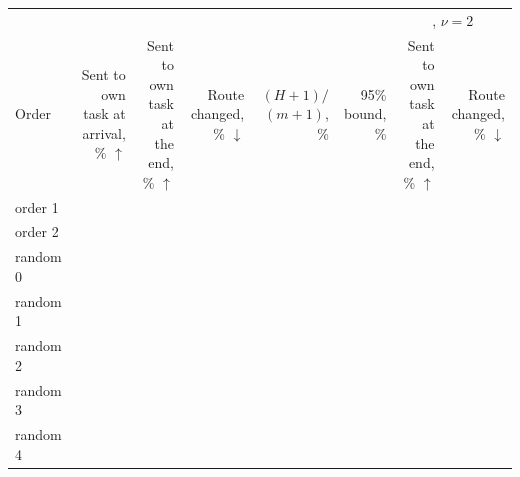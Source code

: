 {\footnotesize\setlength{\tabcolsep}{3pt}\begin{tabular}{lrrrrrrr}
    \toprule
    & \multicolumn{5}{c}{\recog{}} & \multicolumn{2}{c}{\handicap{}, $\nu = 2$} \\
    \cmidrule(lr){2-6}\cmidrule(l){7-8}
    Order & \shortstack[r]{Sent to\\own task\\at arrival,\\\% $\uparrow$} & \shortstack[r]{Sent to\\own task\\at the end,\\\% $\uparrow$} & \shortstack[r]{Route\\changed,\\\% $\downarrow$} & \shortstack[r]{$(H{+}1)/$\\$(m{+}1)$, \%} & \shortstack[r]{95\% bound,\\\%} & \shortstack[r]{Sent to\\own task\\at the end,\\\% $\uparrow$} & \shortstack[r]{Route\\changed,\\\% $\downarrow$} \\
    \midrule
    order 1 & \AudOrdOneLArrive{} & \AudOrdOneLEnd{} & \AudOrdOneLChanged{} & \AudOrdOneLAuditLine{} & \AudOrdOneLAuditBound{} & \AudOrdOneHEnd{} & \AudOrdOneHChanged{} \\
    order 2 & \AudOrdTwoLArrive{} & \AudOrdTwoLEnd{} & \AudOrdTwoLChanged{} & \AudOrdTwoLAuditLine{} & \AudOrdTwoLAuditBound{} & \AudOrdTwoHEnd{} & \AudOrdTwoHChanged{} \\
    random 0 & \AudOrdRandZeroLArrive{} & \AudOrdRandZeroLEnd{} & \AudOrdRandZeroLChanged{} & \AudOrdRandZeroLAuditLine{} & \AudOrdRandZeroLAuditBound{} & \AudOrdRandZeroHEnd{} & \AudOrdRandZeroHChanged{} \\
    random 1 & \AudOrdRandOneLArrive{} & \AudOrdRandOneLEnd{} & \AudOrdRandOneLChanged{} & \AudOrdRandOneLAuditLine{} & \AudOrdRandOneLAuditBound{} & \AudOrdRandOneHEnd{} & \AudOrdRandOneHChanged{} \\
    random 2 & \AudOrdRandTwoLArrive{} & \AudOrdRandTwoLEnd{} & \AudOrdRandTwoLChanged{} & \AudOrdRandTwoLAuditLine{} & \AudOrdRandTwoLAuditBound{} & \AudOrdRandTwoHEnd{} & \AudOrdRandTwoHChanged{} \\
    random 3 & \AudOrdRandThreeLArrive{} & \AudOrdRandThreeLEnd{} & \AudOrdRandThreeLChanged{} & \AudOrdRandThreeLAuditLine{} & \AudOrdRandThreeLAuditBound{} & \AudOrdRandThreeHEnd{} & \AudOrdRandThreeHChanged{} \\
    random 4 & \AudOrdRandFourLArrive{} & \AudOrdRandFourLEnd{} & \AudOrdRandFourLChanged{} & \AudOrdRandFourLAuditLine{} & \AudOrdRandFourLAuditBound{} & \AudOrdRandFourHEnd{} & \AudOrdRandFourHChanged{} \\
    \bottomrule
\end{tabular}}
